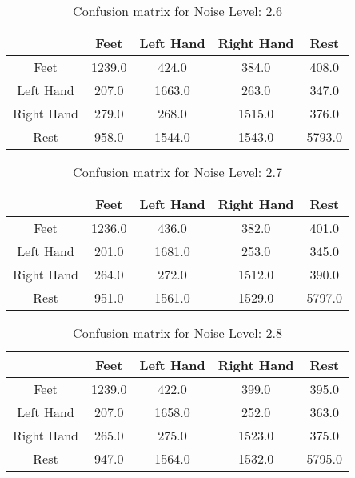 \begin{table}[!htbp]
    \centering
    \begin{tabular}{|c||c|c|c|c|}
        \hline
		 & Feet & Left Hand & Right Hand & Rest \\
        \hline
        \hline
        Feet & 1239.0 & 424.0 & 384.0 & 408.0 \\
        \hline
        Left Hand & 207.0 & 1663.0 & 263.0 & 347.0 \\
        \hline
        Right Hand & 279.0 & 268.0 & 1515.0 & 376.0 \\
        \hline
        Rest & 958.0 & 1544.0 & 1543.0 & 5793.0 \\
        \hline
    \end{tabular}
    \caption{Confusion matrix for Noise Level: 2.6}
\end{table}

\begin{table}[!htbp]
    \centering
    \begin{tabular}{|c||c|c|c|c|}
        \hline
		 & Feet & Left Hand & Right Hand & Rest \\
        \hline
        \hline
        Feet & 1236.0 & 436.0 & 382.0 & 401.0 \\
        \hline
        Left Hand & 201.0 & 1681.0 & 253.0 & 345.0 \\
        \hline
        Right Hand & 264.0 & 272.0 & 1512.0 & 390.0 \\
        \hline
        Rest & 951.0 & 1561.0 & 1529.0 & 5797.0 \\
        \hline
    \end{tabular}
    \caption{Confusion matrix for Noise Level: 2.7}
\end{table}

\begin{table}[!htbp]
    \centering
    \begin{tabular}{|c||c|c|c|c|}
        \hline
		 & Feet & Left Hand & Right Hand & Rest \\
        \hline
        \hline
        Feet & 1239.0 & 422.0 & 399.0 & 395.0 \\
        \hline
        Left Hand & 207.0 & 1658.0 & 252.0 & 363.0 \\
        \hline
        Right Hand & 265.0 & 275.0 & 1523.0 & 375.0 \\
        \hline
        Rest & 947.0 & 1564.0 & 1532.0 & 5795.0 \\
        \hline
    \end{tabular}
    \caption{Confusion matrix for Noise Level: 2.8}
\end{table}

